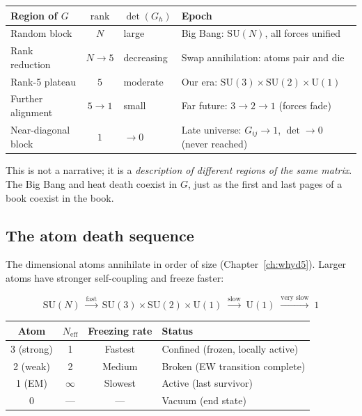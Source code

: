 \documentclass[12pt]{article}
\theoremstyle{remark}
\theoremstyle{definition}
\begin{document}
\begin{center}
\begin{tabular}{lcll}
\hline
Region of $G$ & $\text{rank}$ & $\det(G_h)$ & Epoch \\
\hline
Random block & $N$ & large & Big Bang: $\text{SU}(N)$, all forces unified \\
Rank reduction & $N \to 5$ & decreasing & Swap annihilation: atoms pair and die \\
Rank-5 plateau & $5$ & moderate & Our era: $\text{SU}(3)\!\times\!\text{SU}(2)\!\times\!\text{U}(1)$ \\
Further alignment & $5 \to 1$ & small & Far future: $3 \to 2 \to 1$ (forces fade) \\
Near-diagonal block & $1$ & $\to 0$ & Late universe: $G_{ij} \to 1$, $\det \to 0$ (never reached) \\
\hline
\end{tabular}
\end{center}

This is not a narrative; it is a \emph{description of different regions of the same matrix}. The Big Bang and heat death coexist in $G$, just as the first and last pages of a book coexist in the book.

\subsection{The atom death sequence}

The dimensional atoms annihilate in order of size (Chapter~\ref{ch:whyd5}). Larger atoms have stronger self-coupling and freeze faster:

\begin{equation}
\text{SU}(N) \;\xrightarrow{\text{fast}}\; \text{SU}(3) \times \text{SU}(2) \times \text{U}(1) \;\xrightarrow{\text{slow}}\; \text{U}(1) \;\xrightarrow{\text{very slow}}\; 1
\end{equation}

\begin{center}
\begin{tabular}{cccl}
\hline
Atom & $N_\text{eff}$ & Freezing rate & Status \\
\hline
3 (strong) & 1 & Fastest & Confined (frozen, locally active) \\
2 (weak) & 2 & Medium & Broken (EW transition complete) \\
1 (EM) & $\infty$ & Slowest & Active (last survivor) \\
0 & --- & --- & Vacuum (end state) \\
\hline
\end{tabular}
\end{center}
\end{document}
